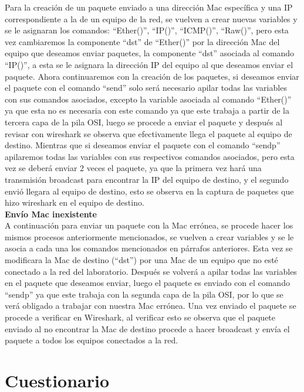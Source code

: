 \documentclass{udpreport}
\begin{document}
		Para la creación de un paquete enviado a una dirección Mac específica y una IP correspondiente a la de un equipo de la red, se vuelven a crear nuevas variables y se le asignaran los comandos: “Ether()”, “IP()”, “ICMP()”, “Raw()”, pero esta vez cambiaremos la componente “dst” de “Ether()” por la dirección Mac del equipo que deseamos enviar paquetes, la componente “dst” asociada al comando “IP()”, a esta se le asignara la dirección IP del equipo al que  deseamos enviar el paquete. Ahora continuaremos con la creación de los paquetes, si deseamos enviar el paquete con el comando “send” solo será necesario apilar todas las variables con sus comandos asociados, excepto la variable asociada al comando “Ether()” ya que esta no es necesaria con este comando ya que este trabaja a partir de la tercera capa de la pila OSI, luego se procede a enviar el paquete y  después al revisar con wireshark se observa que efectivamente llega el paquete al equipo de destino. Mientras que si deseamos enviar el paquete con el comando “sendp” apilaremos todas las variables con sus respectivos comandos asociados,  pero esta vez se deberá enviar 2 veces el paquete, ya que la primera vez hará una transmisión broadcast para encontrar la IP del equipo de destino, y el segundo envió llegara al equipo de destino, esto se observa en la captura de paquetes que hizo wireshark en el equipo de destino.\\
		{\bf \large Envío Mac inexistente}\\
		A continuación para enviar un paquete con la Mac errónea, se procede hacer los mismos procesos anteriormente mencionados, se vuelven a crear variables y se le asocia a cada una los comandos mencionados en párrafos anteriores. Esta vez se modificara la Mac de destino (“dst”)  por una Mac de un equipo que no esté conectado a la red del laboratorio. Después se volverá a apilar todas las variables en el paquete que deseamos enviar, luego el paquete es enviado con el comando “sendp” ya que este trabaja con la segunda capa de la pila OSI, por lo que se verá obligado a trabajar con nuestra Mac errónea. Una vez enviado el paquete se procede a verificar en Wireshark, al verificar esto se observa que el paquete enviado al no encontrar la Mac de destino procede a hacer broadcast y envía el paquete a todos los equipos conectados a la red.\\
		
	\section{Cuestionario}
	
\end{document}
